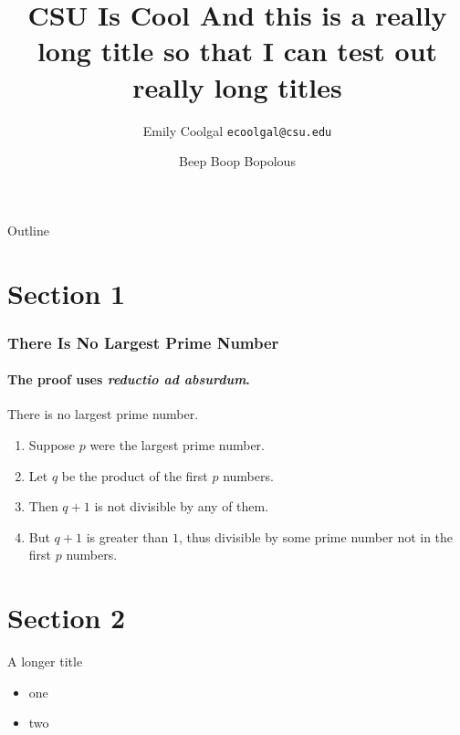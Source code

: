 \documentclass{beamer}
\title{CSU Is Cool And this is a really long title so that I can test out really long titles}
\date[ISPN ’80]{Beep Boop Bopolous}
\author[Emily]{Emily Coolgal \texttt{ecoolgal@csu.edu}}
\begin{document}
\begin{frame}
\titlepage
\end{frame}

\begin{frame}{Outline}
	\tableofcontents
\end{frame}

\section{Section 1}
\begin{frame} 
    \frametitle{There Is No Largest Prime Number} 
    \framesubtitle{The proof uses \textit{reductio ad absurdum}.} 
    \begin{theorem}
        There is no largest prime number.
    \end{theorem} 
    \begin{enumerate} 
        \item<1-| alert@1> Suppose $p$ were the largest prime number. 
        \item<2-> Let $q$ be the product of the first $p$ numbers. 
        \item<3-> Then $q+1$ is not divisible by any of them. 
        \item<4-> But $q + 1$ is greater than $1$, thus divisible by some prime
        number not in the first $p$ numbers.
    \end{enumerate}
\end{frame}

\section{Section 2}
\begin{frame}{A longer title}
    \begin{itemize}
        \item one
        \item two
    \end{itemize}
\end{frame}
\end{document}
